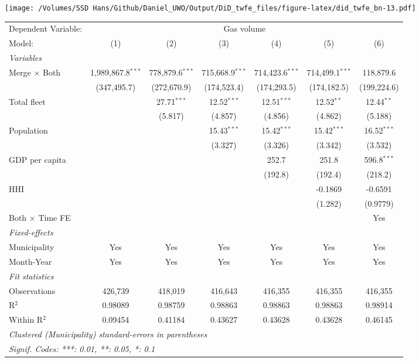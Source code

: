 \documentclass[
]{article}
\begin{document}
\texttt{[image: /Volumes/SSD Hans/Github/Daniel\_UWO/Output/DiD\_twfe\_files/figure-latex/did\_twfe\_bn-13.pdf]}

\begin{tabular}{lcccccc}
\tabularnewline\midrule\midrule
Dependent Variable:&\multicolumn{6}{c}{Gas volume}\\
Model:&(1) & (2) & (3) & (4) & (5) & (6)\\
\midrule \emph{Variables}&   &   &   &   &   &  \\
Merge $\times $ Both & 1,989,867.8$^{***}$ & 778,879.6$^{***}$ & 715,668.9$^{***}$ & 714,423.6$^{***}$ & 714,499.1$^{***}$ & 118,879.6\\
  &(347,495.7) & (272,670.9) & (174,523.4) & (174,293.5) & (174,182.5) & (199,224.6)\\
Total fleet &    & 27.71$^{***}$ & 12.52$^{***}$ & 12.51$^{***}$ & 12.52$^{**}$ & 12.44$^{**}$\\
  &   & (5.817) & (4.857) & (4.856) & (4.862) & (5.188)\\
Population &    &    & 15.43$^{***}$ & 15.42$^{***}$ & 15.42$^{***}$ & 16.52$^{***}$\\
  &   &    & (3.327) & (3.326) & (3.342) & (3.532)\\
GDP per capita &    &    &    & 252.7 & 251.8 & 596.8$^{***}$\\
  &   &    &    & (192.8) & (192.4) & (218.2)\\
HHI &    &    &    &    & -0.1869 & -0.6591\\
  &   &    &    &    & (1.282) & (0.9779)\\
Both $\times$ Time FE &  &  &  &  &  & Yes\\
\midrule \emph{Fixed-effects}&   &   &   &   &   &  \\
Municipality & Yes & Yes & Yes & Yes & Yes & Yes\\
Month-Year & Yes & Yes & Yes & Yes & Yes & Yes\\
\midrule \emph{Fit statistics}&  & & & & & \\
Observations & 426,739&418,019&416,643&416,355&416,355&416,355\\
R$^2$ & 0.98089&0.98759&0.98863&0.98863&0.98863&0.98914\\
Within R$^2$ & 0.09454&0.41184&0.43627&0.43628&0.43628&0.46145\\
\midrule\midrule\multicolumn{7}{l}{\emph{Clustered (Municipality) standard-errors in parentheses}}\\
\multicolumn{7}{l}{\emph{Signif. Codes: ***: 0.01, **: 0.05, *: 0.1}}\\
\end{tabular}
\end{document}
